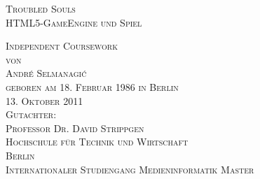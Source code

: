 \thispagestyle{empty}


\begin{center}

\vspace*{2cm}
\Large
\textsc{Troubled Souls}\\
\textsc{HTML5-GameEngine und Spiel}

\vspace{4cm}

\textsc{Independent Coursework\\[0.5\baselineskip]
von\\[0.5\baselineskip]
André Selmanagi\'{c}\\
{\normalsize \textsc{geboren am 18. Februar 1986 in Berlin}}}\\

\vspace{4cm}
\textsc{13. Oktober 2011}\\ %

\vspace{1cm}
\textsc{Gutachter:\\
Professor Dr. David Strippgen}\\

\vspace{1cm}
\textsc{Hochschule für Technik und Wirtschaft\\
Berlin\\
Internationaler Studiengang Medieninformatik Master}

\end{center}

\addtocounter{page}{-1}
